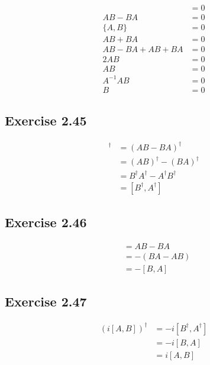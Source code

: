 \documentclass{article}
\begin{document}
\begin{align*}
  [A, B]                & = 0 \\
  A B - B A             & = 0 \\
  \{A, B\}              & = 0 \\
  A B + B A             & = 0 \\
  A B - B A + A B + B A & = 0 \\
  2 A B                 & = 0 \\
  A B                   & = 0 \\
  A^{-1} A B            & = 0 \\
  B                     & = 0
\end{align*}

\subsection*{Exercise 2.45}

\begin{align*}
  [A, B]^\dagger & = (A B - B A)^\dagger                       \\
                 & = (A B)^\dagger - (B A)^\dagger             \\
                 & = B^\dagger A^\dagger - A^\dagger B^\dagger \\
                 & = [B^\dagger, A^\dagger]
\end{align*}

\subsection*{Exercise 2.46}

\begin{align*}
  [A, B] & = A B - B A    \\
         & = -(B A - A B) \\
         & = -[B, A]
\end{align*}

\subsection*{Exercise 2.47}

\begin{align*}
  (i [A, B])^\dagger & = -i [B^\dagger, A^\dagger] \\
                     & = -i [B, A]                 \\
                     & = i [A, B]
\end{align*}
\end{document}
